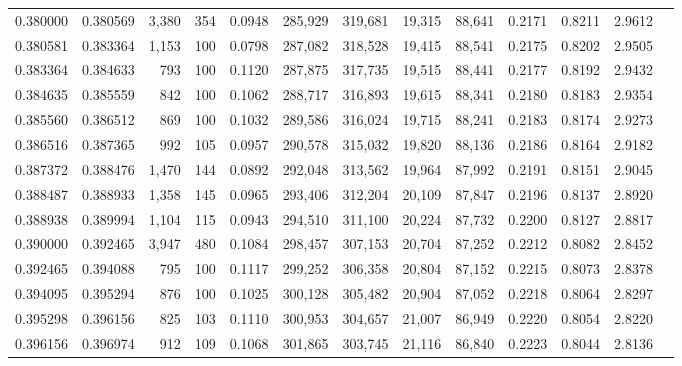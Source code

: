 \begin{tabular}{rrrrrrrrrrrrr}
0.380000 & 0.380569 & 3,380 & 354 &                                     0.0948 & 285,929 & 319,681 &  19,315 &  88,641 & 0.2171 & 0.8211 & 2.9612 \\
0.380581 & 0.383364 & 1,153 & 100 &                                     0.0798 & 287,082 & 318,528 &  19,415 &  88,541 & 0.2175 & 0.8202 & 2.9505 \\
0.383364 & 0.384633 &   793 & 100 &                                     0.1120 & 287,875 & 317,735 &  19,515 &  88,441 & 0.2177 & 0.8192 & 2.9432 \\
0.384635 & 0.385559 &   842 & 100 &                                     0.1062 & 288,717 & 316,893 &  19,615 &  88,341 & 0.2180 & 0.8183 & 2.9354 \\
0.385560 & 0.386512 &   869 & 100 &                                     0.1032 & 289,586 & 316,024 &  19,715 &  88,241 & 0.2183 & 0.8174 & 2.9273 \\
0.386516 & 0.387365 &   992 & 105 &                                     0.0957 & 290,578 & 315,032 &  19,820 &  88,136 & 0.2186 & 0.8164 & 2.9182 \\
0.387372 & 0.388476 & 1,470 & 144 &                                     0.0892 & 292,048 & 313,562 &  19,964 &  87,992 & 0.2191 & 0.8151 & 2.9045 \\
0.388487 & 0.388933 & 1,358 & 145 &                                     0.0965 & 293,406 & 312,204 &  20,109 &  87,847 & 0.2196 & 0.8137 & 2.8920 \\
0.388938 & 0.389994 & 1,104 & 115 &                                     0.0943 & 294,510 & 311,100 &  20,224 &  87,732 & 0.2200 & 0.8127 & 2.8817 \\
0.390000 & 0.392465 & 3,947 & 480 &                                     0.1084 & 298,457 & 307,153 &  20,704 &  87,252 & 0.2212 & 0.8082 & 2.8452 \\
0.392465 & 0.394088 &   795 & 100 &                                     0.1117 & 299,252 & 306,358 &  20,804 &  87,152 & 0.2215 & 0.8073 & 2.8378 \\
0.394095 & 0.395294 &   876 & 100 &                                     0.1025 & 300,128 & 305,482 &  20,904 &  87,052 & 0.2218 & 0.8064 & 2.8297 \\
0.395298 & 0.396156 &   825 & 103 &                                     0.1110 & 300,953 & 304,657 &  21,007 &  86,949 & 0.2220 & 0.8054 & 2.8220 \\
0.396156 & 0.396974 &   912 & 109 &                                     0.1068 & 301,865 & 303,745 &  21,116 &  86,840 & 0.2223 & 0.8044 & 2.8136 \\

\end{tabular}
